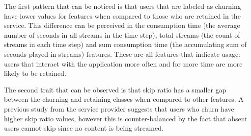 \documentclass{kththesis}
\begin{document}
The first pattern that can be noticed is that users that are labeled as churning have lower values for features when compared to those who are retained in the service. This difference can be perceived in the consumption time (the average number of seconds in all streams in the time step), total streams (the count of streams in each time step) and sum consumption time (the accumulating sum of seconds played in streams) features. These are all features that indicate usage: users that interact with the application more often and for more time are more likely to be retained.

The second trait that can be observed is that skip ratio has a smaller gap between the churning and retaining classes when compared to other features. A previous study from the service provider suggests that users who churn have higher skip ratio values, however this is counter-balanced by the fact that absent users cannot skip since no content is being streamed.
	
\end{document}
